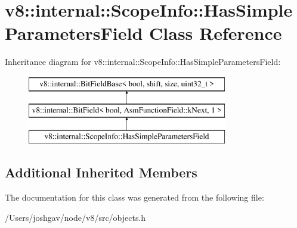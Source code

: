 \hypertarget{classv8_1_1internal_1_1_scope_info_1_1_has_simple_parameters_field}{}\section{v8\+:\+:internal\+:\+:Scope\+Info\+:\+:Has\+Simple\+Parameters\+Field Class Reference}
\label{classv8_1_1internal_1_1_scope_info_1_1_has_simple_parameters_field}
Inheritance diagram for v8\+:\+:internal\+:\+:Scope\+Info\+:\+:Has\+Simple\+Parameters\+Field\+:\begin{figure}[H]
\begin{center}
\leavevmode
\includegraphics[height=3.000000cm]{classv8_1_1internal_1_1_scope_info_1_1_has_simple_parameters_field}
\end{center}
\end{figure}
\subsection*{Additional Inherited Members}


The documentation for this class was generated from the following file\+:\begin{DoxyCompactItemize}
\item 
/\+Users/joshgav/node/v8/src/objects.\+h\end{DoxyCompactItemize}
